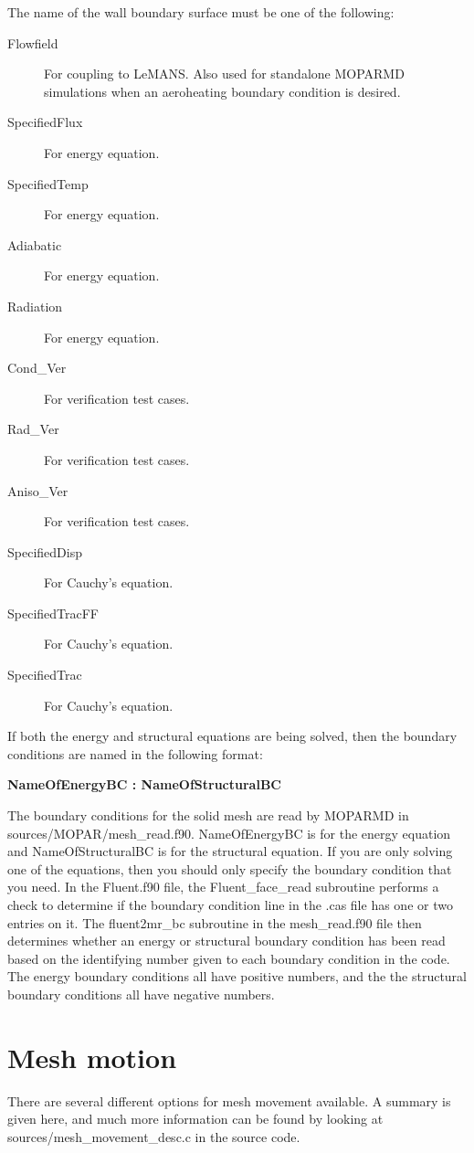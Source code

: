 \documentclass[]{article}
\begin{document}
\noindent The name of the wall boundary surface must be one of the following:
\begin{description}
 \item [Flowfield] For coupling to LeMANS.  Also used for standalone MOPARMD simulations when an aeroheating boundary condition is desired.
 \item [SpecifiedFlux] For energy equation.
 \item [SpecifiedTemp] For energy equation.
 \item [Adiabatic] For energy equation.
 \item [Radiation] For energy equation.
 \item [Cond\_Ver] For verification test cases.
 \item [Rad\_Ver] For verification test cases.
 \item [Aniso\_Ver] For verification test cases.
 \item [SpecifiedDisp] For Cauchy's equation.
 \item [SpecifiedTracFF] For Cauchy's equation.
 \item [SpecifiedTrac] For Cauchy's equation.
\end{description}

If both the energy and structural equations are being solved, then the boundary conditions are named in the following format:
\begin{center}\textbf{NameOfEnergyBC : NameOfStructuralBC}\end{center}

\noindent The boundary conditions for the solid mesh are read by MOPARMD in sources/MOPAR/mesh\_read.f90.  NameOfEnergyBC is for the energy equation and NameOfStructuralBC is for the structural equation. If you are only solving one of the equations, then you should only specify the boundary condition that you need. In the Fluent.f90 file,  the Fluent\_face\_read subroutine performs a check to determine if the boundary condition line in the .cas file has one or two entries on it. The fluent2mr\_bc subroutine in the mesh\_read.f90 file then determines whether an energy or structural boundary condition has been read based on the identifying number given to each boundary condition in the code. The energy boundary conditions all have positive numbers, and the the structural boundary conditions all have negative numbers.

\section{Mesh motion}\label{sec:mesh_move}
There are several different options for mesh movement available. A summary is given here, and much more information can be found by looking at sources/mesh\_movement\_desc.c in the source code.
\end{document}
